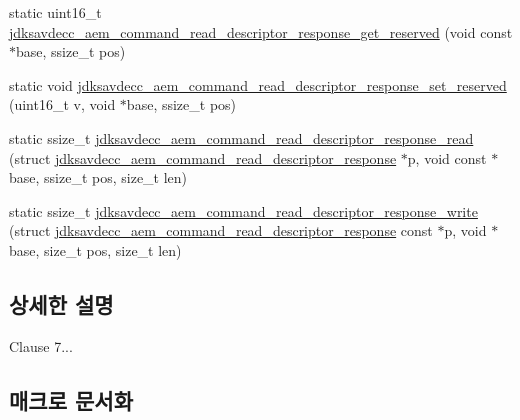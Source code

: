 \begin{DoxyCompactItemize}
\item 
static uint16\+\_\+t \hyperlink{group__command__read__descriptor__response_ga53774a513591f6a9fa2ecbfee4686c45}{jdksavdecc\+\_\+aem\+\_\+command\+\_\+read\+\_\+descriptor\+\_\+response\+\_\+get\+\_\+reserved} (void const $\ast$base, ssize\+\_\+t pos)
\item 
static void \hyperlink{group__command__read__descriptor__response_ga218aca53bde52b5337d48a57f363f2ad}{jdksavdecc\+\_\+aem\+\_\+command\+\_\+read\+\_\+descriptor\+\_\+response\+\_\+set\+\_\+reserved} (uint16\+\_\+t v, void $\ast$base, ssize\+\_\+t pos)
\item 
static ssize\+\_\+t \hyperlink{group__command__read__descriptor__response_ga5158f2f9b162b942560eec4283169b05}{jdksavdecc\+\_\+aem\+\_\+command\+\_\+read\+\_\+descriptor\+\_\+response\+\_\+read} (struct \hyperlink{structjdksavdecc__aem__command__read__descriptor__response}{jdksavdecc\+\_\+aem\+\_\+command\+\_\+read\+\_\+descriptor\+\_\+response} $\ast$p, void const $\ast$base, ssize\+\_\+t pos, size\+\_\+t len)
\item 
static ssize\+\_\+t \hyperlink{group__command__read__descriptor__response_ga9b0f81b72f0449bec5e19a9b042357dc}{jdksavdecc\+\_\+aem\+\_\+command\+\_\+read\+\_\+descriptor\+\_\+response\+\_\+write} (struct \hyperlink{structjdksavdecc__aem__command__read__descriptor__response}{jdksavdecc\+\_\+aem\+\_\+command\+\_\+read\+\_\+descriptor\+\_\+response} const $\ast$p, void $\ast$base, size\+\_\+t pos, size\+\_\+t len)
\end{DoxyCompactItemize}


\subsection{상세한 설명}
Clause 7... 

\subsection{매크로 문서화}
